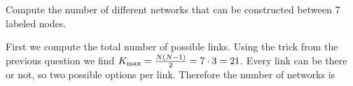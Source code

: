 


Compute the number of different networks that can be constructed between 7 labeled nodes.


\solution
First we compute the total number of possible links. Using the trick from the previous question we find $K_{\rm max}=\frac{N(N-1)}{2}=7 \cdot 3=21$. Every link can be there or not, so two possible options per link. Therefore the number of networks is


